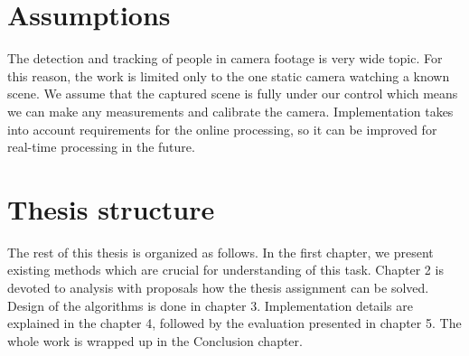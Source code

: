 \begin{introduction}
\section{Assumptions}   
The detection and tracking of people in camera footage is very wide topic. For this reason, the work is limited only to the one static camera watching a known scene. We  assume that the captured scene is fully under our control which means we can make any measurements and calibrate the camera. Implementation takes into account requirements for the online processing, so it can be improved for real-time processing in the future. 

\section{Thesis structure}
    The rest of this thesis is organized as follows. In the first chapter, we present existing methods which are crucial for understanding of this task. Chapter 2 is devoted to analysis with proposals how the thesis assignment can be solved. Design of the algorithms is done in chapter 3. Implementation details are explained in the chapter 4, followed by the evaluation presented in chapter 5. The whole work is wrapped up in the Conclusion chapter.

\end{introduction}
